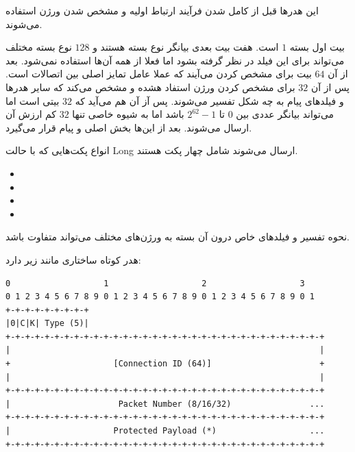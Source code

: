 \documentclass[12pt]{article}
\begin{document}
\begin{enumerate}
\begin{center}
\begin{latin}
\begin{Verbatim}
	\end{Verbatim}
	

\end{latin}
\end{center}

این هدرها قبل از کامل شدن فرآیند ارتباط اولیه و مشخص شدن ورژن استفاده می‌شوند.

 بیت اول بسته $1$ است. هفت بیت بعدی بیانگر نوع بسته هستند و $128$ نوع بسته مختلف می‌تواند برای این فیلد در نظر گرفته بشود اما فعلا از همه‌ آن‌ها استفاده نمی‌شود.  بعد از آن $64$ بیت برای مشخص کردن  می‌آیند که عملا عامل تمایز اصلی بین اتصالات است.
پس از آن $32$ برای مشخص کردن ورژن  استفاد هشده و مشخص می‌کند که سایر هدر‌ها و فیلدهای پیام به چه شکل تفسیر می‌شوند. پس آز آن هم  می‌آید که $32$ بیتی است اما می‌تواند بیانگر عددی بین $0$ تا $2^{62}-1$ باشد اما به شیوه خاصی تنها $32$ کم ارزش‌ آن ارسال می‌شوند. بعد از این‌ها بخش اصلی و  پیام قرار می‌گیرد.

انواع پکت‌هایی که با حالت Long ارسال می‌شوند شامل چهار پکت هستند.

\begin{latin}
\begin{itemize}
	\item {}
	
	\item {}
	
	
	\item {}
	
	
	\item {}
\end{itemize}
\end{latin}

نحوه تفسیر  و فیلد‌های خاص درون آن بسته به ورژن‌های مختلف  می‌تواند متفاوت باشد.
	
	
	هدر کوتاه ساختاری مانند زیر دارد:
	
	\begin{latin}
		\begin{center}
			\begin{Verbatim}
0                   1                   2                   3
0 1 2 3 4 5 6 7 8 9 0 1 2 3 4 5 6 7 8 9 0 1 2 3 4 5 6 7 8 9 0 1
+-+-+-+-+-+-+-+-+
|0|C|K| Type (5)|
+-+-+-+-+-+-+-+-+-+-+-+-+-+-+-+-+-+-+-+-+-+-+-+-+-+-+-+-+-+-+-+-+
|                                                               |
+                     [Connection ID (64)]                      +
|                                                               |
+-+-+-+-+-+-+-+-+-+-+-+-+-+-+-+-+-+-+-+-+-+-+-+-+-+-+-+-+-+-+-+-+
|                      Packet Number (8/16/32)                ...
+-+-+-+-+-+-+-+-+-+-+-+-+-+-+-+-+-+-+-+-+-+-+-+-+-+-+-+-+-+-+-+-+
|                     Protected Payload (*)                   ...
+-+-+-+-+-+-+-+-+-+-+-+-+-+-+-+-+-+-+-+-+-+-+-+-+-+-+-+-+-+-+-+-+


\end{Verbatim}
\end{center}
\end{latin}
\end{enumerate}
\end{document}
